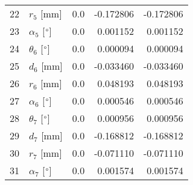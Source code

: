 \documentclass{standalone}%
\begin{document}
\begin{tabular}{llrrr}
22 &              $r_{5}$ [mm] &       0.0 &  -0.172806 &  -0.172806 \\
23 &  $\alpha_{5}$ [$\degree$] &       0.0 &   0.001152 &   0.001152 \\
24 &  $\theta_{6}$ [$\degree$] &       0.0 &   0.000094 &   0.000094 \\
25 &              $d_{6}$ [mm] &       0.0 &  -0.033460 &  -0.033460 \\
26 &              $r_{6}$ [mm] &       0.0 &   0.048193 &   0.048193 \\
27 &  $\alpha_{6}$ [$\degree$] &       0.0 &   0.000546 &   0.000546 \\
28 &  $\theta_{7}$ [$\degree$] &       0.0 &   0.000956 &   0.000956 \\
29 &              $d_{7}$ [mm] &       0.0 &  -0.168812 &  -0.168812 \\
30 &              $r_{7}$ [mm] &       0.0 &  -0.071110 &  -0.071110 \\
31 &  $\alpha_{7}$ [$\degree$] &       0.0 &   0.001574 &   0.001574 \\
\bottomrule
\end{tabular}
%
\end{document}
